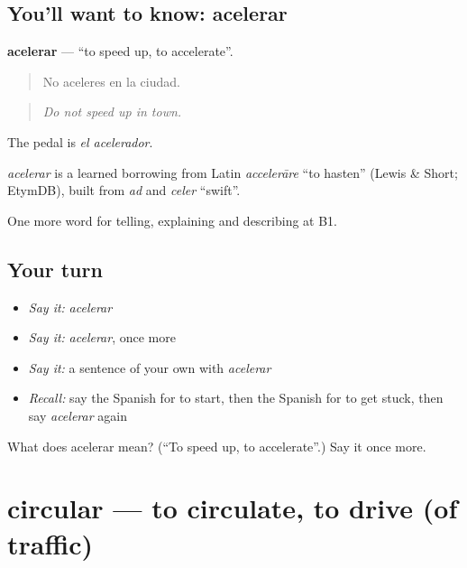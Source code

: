 \subsection*{You'll want to know: acelerar}
\textbf{acelerar} — \textquotedblleft{}to speed up, to accelerate\textquotedblright{}.

\begin{quote}
No aceleres en la ciudad.
\end{quote}

\begin{quote}
\emph{Do not speed up in town.}
\end{quote}

The pedal is \emph{el acelerador}.

\begin{cousinweb}
\emph{acelerar} is a learned borrowing from Latin \emph{accelerāre} \textquotedblleft{}to hasten\textquotedblright{} (Lewis \& Short; EtymDB), built from \emph{ad} and \emph{celer} \textquotedblleft{}swift\textquotedblright{}.
\end{cousinweb}

\begin{grammarlens}[title={What you've built}]
One more word for telling, explaining and describing at B1.
\end{grammarlens}

\subsection*{Your turn}
\begin{itemize}
\raggedright
  \item \emph{Say it:} \emph{acelerar}
  \item \emph{Say it:} \emph{acelerar}, once more
  \item \emph{Say it:} a sentence of your own with \emph{acelerar}
  \item \emph{Recall:} say the Spanish for to start, then the Spanish for to get stuck, then say \emph{acelerar} again
\end{itemize}

\begin{tcolorbox}[breakable,colback=teal!4,colframe=teal!35!black,title={Before you move on}]
What does acelerar mean? (\textquotedblleft{}To speed up, to accelerate\textquotedblright{}.) Say it once more.
\end{tcolorbox}
\section[circular]{circular — to circulate, to drive (of traffic)}

